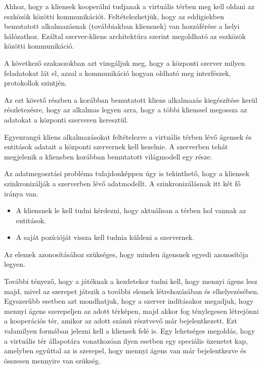 
Ahhoz, hogy a kliensek kooperálni tudjanak a virtuális térben meg kell oldani az eszközök közötti kommunikációt.
Feltételezhetjük, hogy az eddigiekben bemutatott alkalmazásnak (továbbiakban kliensnek) van hozzáférése a helyi hálózathoz.
Ezáltal szerver-kliens architektúra szerint megoldható az eszközök közötti kommunikáció.

A következő szakaszokban azt vizsgáljuk meg, hogy a központi szerver milyen feladatokat lát el, azzal a kommunikáció hogyan oldható meg interfészek, protokollok szintjén.

Az ezt követő részben a korábban bemutatott kliens alkalmazás kiegészítése kerül részletezésre, hogy az alkalmas legyen arra, hogy a többi klienssel megossza az adatokat a központi szerveren keresztül.


Egyenrangú kliens alkalmazásokat feltételezve a virtuális térben lévő ágensek és entitások adatait a központi szervernek kell kezelnie.
A szerverben tehát megjelenik a kliensben korábban bemutatott világmodell egy része.

Az adatmegosztási probléma tulajdonképpen úgy is tekinthető, hogy a kliensek szinkronizálják a szerverben lévő adatmodellt.
A szinkronizálásnak itt két fő iránya van.
\begin{itemize}
	\item A kliensnek le kell tudni kérdezni, hogy aktuálisan a térben hol vannak az entitások.
	\item A saját pozícióját vissza kell tudnia küldeni a szervernek.
\end{itemize}
Az elemek azonosításához szükséges, hogy minden ágensnek egyedi azonosítója legyen.

További tényező, hogy a játéknak a kezdetekor tudni kell, hogy mennyi ágens lesz majd, mivel az szerepet játszik a további elemek létrehozásában és elhelyezésében.
Egyszerűbb esetben azt mondhatjuk, hogy a szerver indításakor megadjuk, hogy mennyi ágens szerepeljen az adott térképen, majd akkor fog ténylegesen létrejönni a kooperációs tér, amikor az adott számú résztvevő már bejelentkezett.
Ezt valamilyen formában jelezni kell a kliensek felé is.
Egy lehetséges megoldás, hogy a virtuális tér állapotára vonatkozóan ilyen esetben egy speciális üzenetet kap, amelyben egyúttal az is szerepel, hogy mennyi ágens van már bejelentkezve és összesen mennyire van szükség.

